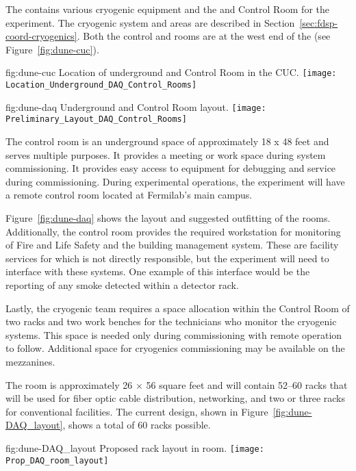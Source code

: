 The  contains various cryogenic equipment and the
 and Control Room for the  experiment.  The
cryogenic system and areas are described in
Section~\ref{sec:fdsp-coord-cryogenics}. Both the control and 
rooms are at the west end of the  (see
Figure~\ref{fig:dune-cuc}).
\begin{dunefigure}{fig:dune-cuc}
  {Location of underground  and Control Room in the CUC.}
  \texttt{[image: Location\_Underground\_DAQ\_Control\_Rooms]}
\end{dunefigure}
\begin{dunefigure}{fig:dune-daq}
  {Underground  and Control Room layout.}
  \texttt{[image: Preliminary\_Layout\_DAQ\_Control\_Rooms]}
\end{dunefigure}


The control room is an underground space of approximately 18 x 48 feet
and serves multiple purposes.  It provides a meeting or work space
during system commissioning. It provides easy access to 
equipment for debugging and service during commissioning.  During
experimental operations, the  experiment will have a remote
control room located at Fermilab's main campus.

Figure~\ref{fig:dune-daq} shows the layout and suggested outfitting of
the rooms. Additionally, the control room provides the required
workstation for monitoring of Fire and Life Safety and the building
management system.  These are facility services for which  is not
directly responsible, but the experiment will need to
interface with these systems.  One example of this interface would be
the reporting of any smoke detected within a detector rack.

Lastly, the cryogenic team requires a space allocation within the
Control Room of two racks and two work benches for the technicians who
monitor the cryogenic systems. This space is needed only during
commissioning with remote operation to follow. Additional space for
cryogenics commissioning may be available on the mezzanines.
       
The  room is approximately 26 $\times$ 56 square feet and will
contain 52--60 racks that will be used for fiber optic cable
distribution, networking,   and two or three
racks for conventional facilities.  The current design, shown in
Figure~\ref{fig:dune-DAQ_layout}, shows a total of 60 racks 
possible.
\begin{dunefigure}{fig:dune-DAQ_layout}
  {Proposed rack layout in  room.}
  \texttt{[image: Prop\_DAQ\_room\_layout]}
\end{dunefigure}
  

